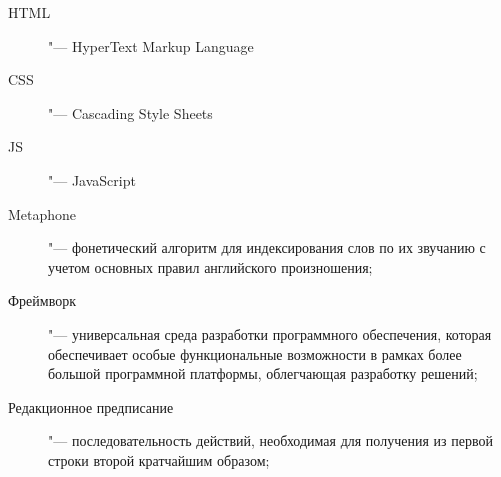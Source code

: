 \abbreviations
\begin{description}
    \item[HTML] "--- HyperText Markup Language
    \item[CSS] "--- Cascading Style Sheets
    \item[JS] "--- JavaScript
\end{description}
\begin{description}
	\item[Metaphone] "--- фонетический алгоритм для индексирования слов по их звучанию с учетом основных правил английского произношения;
	\item[Фреймворк] "--- универсальная среда разработки программного обеспечения, которая обеспечивает особые функциональные возможности в рамках более большой программной платформы, облегчающая разработку решений;
	\item[Редакционное предписание] "--- последовательность действий, необходимая для получения из первой строки второй кратчайшим образом;
\end{description}
